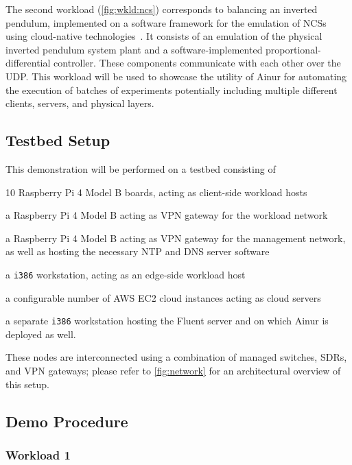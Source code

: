 The second workload (\cref{fig:wkld:ncs}) corresponds to  balancing an inverted pendulum, implemented on a software framework for the emulation of \acp{NCS} using cloud-native technologies~\cite{cleave}.
It consists of an emulation of the physical inverted pendulum system plant and a software-implemented proportional-differential controller.
These components communicate with each other over the \gls{UDP}.
This workload will be used to showcase the utility of Ainur for automating the execution of batches of experiments potentially including multiple different clients, servers, and physical layers.

\subsection{Testbed Setup}

This demonstration will be performed on a testbed consisting of
\begin{enumerate*}[itemjoin={{; }}, itemjoin*={{; and finally }}]
    \item \num{10} Raspberry Pi 4 Model B boards, acting as client-side workload hosts
    \item a Raspberry Pi 4 Model B acting as \gls{VPN} gateway for the workload network
    \item a Raspberry Pi 4 Model B acting as \gls{VPN} gateway for the management network, as well as hosting the necessary \gls{NTP} and \gls{DNS} server software
    \item a \texttt{i386} workstation, acting as an edge-side workload host
    \item a configurable number of  \gls{AWS} \gls{EC2} cloud instances acting as cloud servers
    \item a separate \texttt{i386} workstation hosting the Fluent server and on which Ainur is deployed as well.
\end{enumerate*}
These nodes are interconnected using a combination of managed switches, \acp{SDR}, and \gls{VPN} gateways; please refer to \cref{fig:network} for an architectural overview of this setup.


\subsection{Demo Procedure}

\subsubsection{Workload 1}

